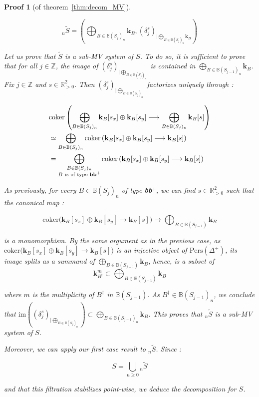 \documentclass[a4paper, english, 11pt]{article}
\newcommand{\kk}[0]{\textbf{k}}
\newcommand{\0}{\vec{0}}
\newcommand{\R}[0]{\mathbb{R}}
\newcommand{\Z}[0]{\mathbb{Z}}
\newcommand{\Pers}[0]{\text{Pers}}
\newtheorem*{pf}{Proof} }
\begin{document}
\begin{pf}[of theorem~\ref{thm:decom_MV}]
\begin{itemize}
$${}_n\tilde{S} = \left (\bigoplus_{B\in \mathbb{B}(S_j)_n } \kk_{B}, (\delta_j^s)_{|\bigoplus_{B\in \mathbb{B}(S_j)_n } \kk_{B}} \right )  $$

 Let us prove that $\tilde{S}$ is a sub-MV system of $S$. To do so, it is sufficient to prove that for all $j\in  \Z$, the image of $(\delta_j^s)_{|\bigoplus_{B\in \mathbb{B}(S_j)_n}}$ is contained in $\bigoplus_{B\in \mathbb{B}(S_{j-1})_n } \kk_{B}$. Fix $j\in \Z$ and $s\in \R^2_{>0}$. Then $(\delta_j^s)_{|\bigoplus_{B\in \mathbb{B}(S_j)_n}}$ factorizes uniquely through : 
 
 \begin{align*}
     & \text{coker} \left ( \bigoplus_{B\in \mathbb{B}(S_j)_n } \kk_{B}[s_x] \oplus  \kk_{B} [s_y] \longrightarrow \bigoplus_{B\in \mathbb{B}(S_j)_n } \kk_{B}[s]  \right )   \\ 
     &\simeq \bigoplus_{B\in \mathbb{B}(S_j)_n }  \text{coker} \left ( \kk_{B}[s_x] \oplus  \kk_{B} [s_y] \longrightarrow  \kk_{B}[s] \right ) \\
     &=  \bigoplus_{ \substack{B\in \mathbb{B}(S_j)_n\\ B ~\text{is of type \textbf{bb$^+$}} } } \text{coker} \left ( \kk_{B}[s_x] \oplus  \kk_{B} [s_y] \longrightarrow  \kk_{B}[s] \right ) 
 \end{align*} 
 
As previously, for every $B\in \mathbb{B}(S_j)_n$ of type \textbf{bb$^+$}, we can find $s\in \R^2_{>0}$ such that the canonical map : 

$$ \text{coker} \big ( \kk_{B}[s_x] \oplus  \kk_{B} [s_y] \longrightarrow  \kk_{B}[s] \big  )  \longrightarrow \bigoplus_{B\in \mathbb{B}(S_{j-1}) } \kk_{B} $$

is a monomorphism. By the same argument as in the previous case, as  $ \text{coker} \big ( \kk_{B}[s_x] \oplus  \kk_{B} [s_y] \longrightarrow  \kk_{B}[s] \big  ) $ is an injective object of $\Pers(\Delta^+)$, its image splits as a summand of $\bigoplus_{B\in \mathbb{B}(S_{j-1}) } \kk_{B}$, hence, is a subset of 
$$  \kk_{B^\dag}^m\subset \bigoplus_{B\in \mathbb{B}(S_{j-1}) } \kk_B $$

where $m$ is the multiplicity of $B^\dag$ in $\mathbb{B}(S_{j-1}) $. As $B^\dag\in \mathbb{B}(S_{j-1})_n$, we conclude that $\text{im} ((\delta_j^s)_{|\bigoplus_{B\in \mathbb{B}(S_j)_n}}) \subset \bigoplus_{B\in \mathbb{B}(S_{j-1})_n } \kk_{B} $. This proves that ${}_n\tilde{S}$ is a sub-MV system of $S$.

Moreover, we can apply our first case result to ${}_n\tilde{S}$. Since : 

$$S = \bigcup_{n\geq 0} {}_n\tilde{S} $$

and that this filtration stabilizes point-wise, we deduce the decomposition for $S$.


\end{itemize}

\end{pf}
\end{document}

